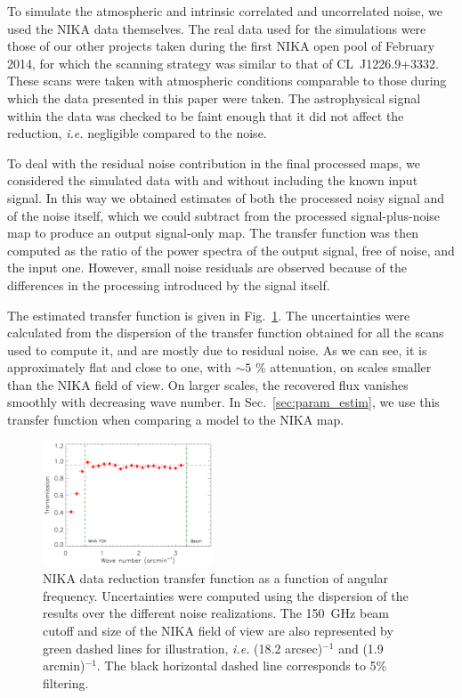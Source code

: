 \documentclass[twocolumn,traditabstract]{aa}
\begin{document}
To simulate the atmospheric and intrinsic correlated and uncorrelated noise, we used the NIKA data themselves. The real data used for the simulations were those of our other projects taken during the first NIKA open pool of February 2014, for which the scanning strategy was similar to that of \mbox{CL~J1226.9+3332}. These scans were taken with atmospheric conditions comparable to those during which the data presented in this paper were taken. The astrophysical signal within the data was checked to be faint enough that it did not affect the reduction, {\it i.e.} negligible compared to the noise. 

To deal with the residual noise contribution in the final processed maps, we considered the simulated data with and without including the known input signal. In this way we obtained estimates of both the processed noisy signal and of the noise itself, which we could subtract from the processed signal-plus-noise map to produce an output signal-only map. The transfer function was then computed as the ratio of the power spectra of the output signal, free of noise, and the input one. However, small noise residuals are observed because of the differences in the processing introduced by the signal itself.

The estimated transfer function is given in Fig.~\ref{fig:transfer_function}. The uncertainties were calculated from the dispersion of the transfer function obtained for all the scans used to compute it, and are mostly due to residual noise. As we can see, it is approximately flat and close to one, with $\sim 5$ \% attenuation, on scales smaller than the NIKA field of view. On larger scales, the recovered flux vanishes smoothly with decreasing wave number. In Sec.~\ref{sec:param_estim}, we use this transfer function when comparing a model to the NIKA map.
	\begin{figure}[h]
	\centering
	\includegraphics[width=0.45\textwidth]{Figure/transfer_function.pdf}
	\caption{NIKA data reduction transfer function as a function of angular frequency. Uncertainties were computed using the dispersion of the results over the different noise realizations. The 150~GHz beam cutoff and size of the NIKA field of view are also represented by green dashed lines for illustration, {\it i.e.} (18.2 arcsec)$^{-1}$ and (1.9 arcmin)$^{-1}$. The black horizontal dashed line corresponds to 5\% filtering.}
        \label{fig:transfer_function}
	\end{figure}
\end{document}
